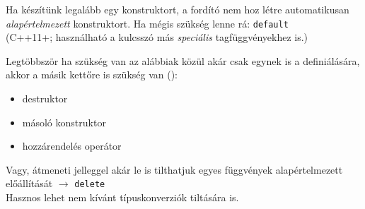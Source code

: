 \documentclass[usenames,dvipsnames,aspectratio=169]{beamer}
\begin{document}
\begin{frame}
    \begin{exampleblock}{}
        \scriptsize
        
        
    \end{exampleblock}
\end{frame}

\begin{frame}
    \begin{exampleblock}{}
        
    \end{exampleblock}
    \vfill
    Ha készítünk legalább egy konstruktort, a fordító nem hoz létre automatikusan \emph{alapértelmezett} konstruktort. Ha mégis szükség lenne rá: \texttt{default} \\ (C++11+; használható a kulcsszó más \emph{speciális} tagfüggvényekhez is.)
\end{frame}

\begin{frame}
    Legtöbbször ha szükség van az alábbiak közül akár csak egynek is a definiálására, akkor a másik kettőre is szükség van ():
    \begin{itemize}
        \item destruktor
        \item másoló konstruktor
        \item hozzárendelés operátor
    \end{itemize}
    \vfill
    Vagy, átmeneti jelleggel akár le is tilthatjuk egyes függvények alapértelmezett előállítását $\to$ \texttt{delete}\\
    Hasznos lehet nem kívánt típuskonverziók tiltására is.
\end{frame}

\begin{frame}
    \begin{exampleblock}{}
        \small
        
        
        
        
        
    \end{exampleblock}
\end{frame}
\end{document}
